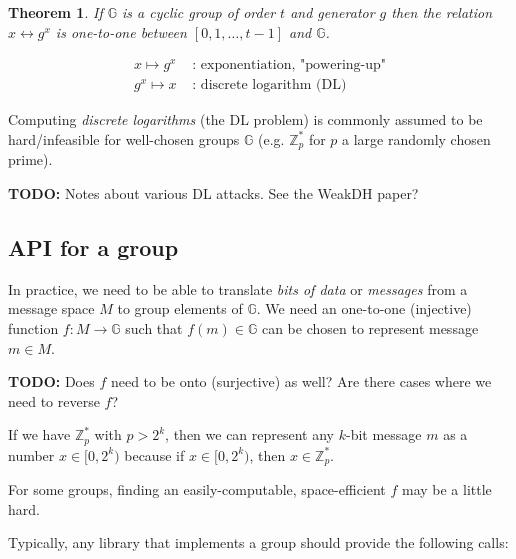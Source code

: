 \documentclass[12pt]{article}
\newtheorem{thm}{Theorem}[section]
\newcommand{\Zp}{\mathbb{Z}^{\ast}_p}
\newcommand{\G}{\mathbb{G}}
\newcommand{\todo}{\textbf{TODO:} }
\begin{document}
\begin{thm}
If $\G$ is a cyclic group of order $t$ and generator $g$ then the relation
$x \leftrightarrow g^x$ is one-to-one between $[0, 1, \dots, t-1]$ and $\G$.
\end{thm}

\begin{align*}
x \mapsto g^x & \text{ : exponentiation, "powering-up"}\\
g^x \mapsto x & \text{ : discrete logarithm (DL)}
\end{align*}

Computing \emph{discrete logarithms} (the DL problem) is commonly assumed to be
hard/infeasible for well-chosen groups $\G$ (e.g. $\Zp$ for $p$ a large randomly
chosen prime).

\todo Notes about various DL attacks. See the WeakDH paper?

\subsection{API for a group}

In practice, we need to be able to translate \emph{bits of data} or
\emph{messages} from a message space $M$ to group elements of $\G$. We need an
one-to-one (injective) function $f : M
\rightarrow \G$ such that $f(m) \in \G$ can be chosen to represent message $m
\in M$.

\todo Does $f$ need to be onto (surjective) as well? Are there cases
where we need to reverse $f$?

\begin{example}
If we have $\Zp$ with $p > 2^k$, then we can represent any $k$-bit
message $m$ as a number $x \in [0, 2^k)$ because if $x \in [0, 2^k)$, then $x
\in \Zp$.
\end{example}

\begin{note}
For some groups, finding an easily-computable, space-efficient $f$ may
be a little hard.
\end{note}

Typically, any library that implements a group should provide the following calls:
\end{document}

